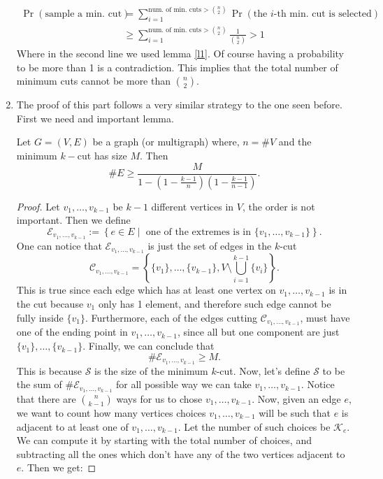 \documentclass[11pt]{article}
\begin{document}
\begin{enumerate}
\begin{align*}
        \Pr(\text{sample a min. cut}) &= \sum_{i=1}^{\text{num. of min. cuts}>\binom{n}{2}}\Pr(\text{the $i$-th min. cut is selected}) \\
        &\geq  \sum_{i=1}^{\text{num. of min. cuts}>\binom{n}{2}} \frac{1}{\binom{n}{2}} > 1
    \end{align*}
    Where in the second line we used lemma \ref{l1}. Of course having a probability to be more than 1 is a contradiction. This implies that the total number of minimum cuts cannot be more than $\binom{n}{2}$. 
    \item The proof of this part follows a very similar strategy to the one seen before. First we need and important lemma.
    \begin{lemma}\label{l2} Let $G = (V,E)$ be a graph (or multigraph) where, $n = \#V$ and the minimum $k-$cut has size $M$. Then
        \begin{equation*}
            \#E \geq \frac{M}{1-\left(1-\frac{k-1}{n}\right)\left(1-\frac{k-1}{n-1}\right)}.
        \end{equation*}
    \end{lemma}
    \begin{proof}
        Let $v_1,\dots,v_{k-1}$ be $k-1$ different vertices in $V$, the order is not important. Then we define 
        \begin{equation*}
            \mathcal{E}_{v_1,\dots,v_{k-1}} := \left\{e \in E \mid \text{ one of the extremes is in }\{v_1,\dots,v_{k-1}\}\right\}.
        \end{equation*} 
        One can notice that $\mathcal{E}_{v_1,\dots,v_{k-1}}$ is just the set of edges in the $k$-cut \begin{equation*}
            \mathcal{C}_{v_1,\dots,v_{k-1}} = \left\{\{v_1\},\dots,\{v_{k-1}\}, V \setminus \bigcup_{i=1}^{k-1}\{v_i\}\right\}.
        \end{equation*}
        This is true since each edge which has at least one vertex on $v_1,\dots,v_{k-1}$ is in the cut because $v_1$ only has 1 element, and therefore such edge cannot be fully inside $\{v_1\}$. Furthermore, each of the edges cutting $\mathcal{C}_{v_1,\dots,v_{k-1}}$, must have one of the ending point in $v_1,\dots,v_{k-1}$, since all but one component are just $\{v_1\},\dots,\{v_{k-1}\}$. Finally, we can conclude that
        \begin{equation*}
            \#\mathcal{E}_{v_1,\dots,v_{k-1}} \geq M.
        \end{equation*}
        This is because $\mathcal{S}$ is the size of the minimum $k$-cut. Now, let's define $\mathcal{S}$ to be the sum of $\#\mathcal{E}_{v_1,\dots,v_{k-1}}$ for all possible way we can take $v_1,\dots,v_{k-1}$. Notice that there are $\binom{n}{k-1}$ ways for us to chose $v_1,\dots,v_{k-1}$. Now, given an edge $e$, we want to count how many vertices choices  $v_1,\dots,v_{k-1}$ will be such that $e$ is adjacent to at least one of $v_1,\dots,v_{k-1}$. Let the number of such choices be $\mathcal{K}_e$. We can compute it by starting with the total number of choices, and subtracting all the ones which don't have any of the two vertices adjacent to $e$. Then we get:

\end{proof}
\end{enumerate}
\end{document}
